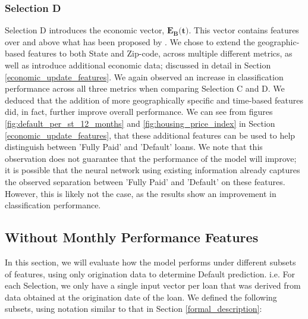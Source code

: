             \subsubsection{Selection D}
            Selection D introduces the economic vector, $\textbf{$\textbf{$\mathbf{E_{B}}$}$(t)}$. This vector contains features over and above what has been proposed by \cite{mortgage_risk}. We chose to extend the geographic-based features to both State and Zip-code, across multiple different metrics, as well as introduce additional economic data; discussed in detail in Section \ref{economic_update_features}. We again observed an increase in classification performance across all three metrics when comparing Selection C and D. We deduced that the addition of more geographically specific and time-based features did, in fact, further improve overall performance. We can see from figures \ref{fig:default_per_st_12_months} and \ref{fig:housing_price_index} in Section \ref{economic_update_features}, that these additional features can be used to help distinguish between 'Fully Paid' and 'Default' loans. We note that this observation does not guarantee that the performance of the model will improve; it is possible that the neural network using existing information already captures the observed separation between 'Fully Paid' and 'Default' on these features. However, this is likely not the case, as the results show an improvement in classification performance.

        \subsection{Without Monthly Performance Features}
        
            In this section, we will evaluate how the model performs under different subsets of features, using only origination data to determine Default prediction. i.e. For each Selection, we only have a single input vector per loan that was derived from data obtained at the origination date of the loan. We defined the following subsets, using notation similar to that in Section \ref{formal_description}:  
            

